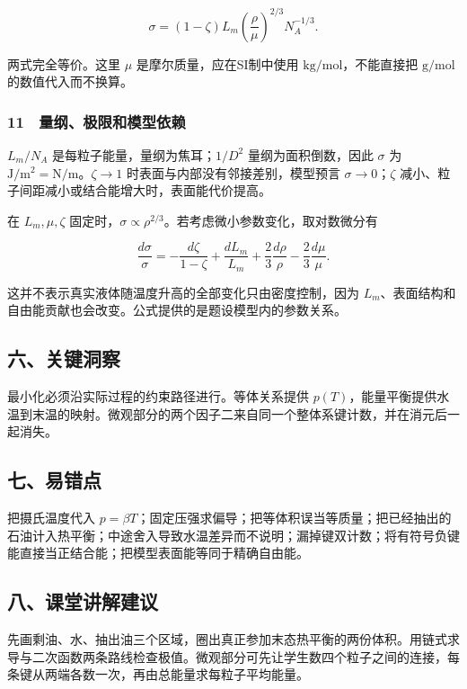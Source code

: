 \documentclass[12pt,a4paper,fontset=fandol]{ctexart}
\begin{document}
\[\boxed{\sigma=(1-\zeta)L_m
\left(\frac\rho\mu\right)^{2/3}N_A^{-1/3}.}\]

两式完全等价。这里 \(\mu\) 是摩尔质量，应在SI制中使用
\(\mathrm{kg/mol}\)，不能直接把 \(\mathrm{g/mol}\) 的数值代入而不换算。

\subsubsection{11　量纲、极限和模型依赖}\label{ux91cfux7eb2ux6781ux9650ux548cux6a21ux578bux4f9dux8d56}

\(L_m/N_A\) 是每粒子能量，量纲为焦耳；\(1/D^2\) 量纲为面积倒数，因此
\(\sigma\) 为 \(\mathrm{J/m^2}= \mathrm{N/m}\)。\(\zeta\to1\)
时表面与内部没有邻接差别，模型预言 \(\sigma\to0\)；\(\zeta\)
减小、粒子间距减小或结合能增大时，表面能代价提高。

在 \(L_m,\mu,\zeta\)
固定时，\(\sigma\propto\rho^{2/3}\)。若考虑微小参数变化，取对数微分有

\[\frac{d\sigma}{\sigma}
=-\frac{d\zeta}{1-\zeta}
+\frac{dL_m}{L_m}
+\frac23\frac{d\rho}{\rho}
-\frac23\frac{d\mu}{\mu}.\]

这并不表示真实液体随温度升高的全部变化只由密度控制，因为
\(L_m\)、表面结构和自由能贡献也会改变。公式提供的是题设模型内的参数关系。

\subsection{六、关键洞察}\label{ux516dux5173ux952eux6d1eux5bdf-2}

最小化必须沿实际过程的约束路径进行。等体关系提供
\(p(T)\)，能量平衡提供水温到末温的映射。微观部分的两个因子二来自同一个整体系键计数，并在消元后一起消失。

\subsection{七、易错点}\label{ux4e03ux6613ux9519ux70b9-2}

把摄氏温度代入
\(p=\beta T\)；固定压强求偏导；把等体积误当等质量；把已经抽出的石油计入热平衡；中途舍入导致水温差异而不说明；漏掉键双计数；将有符号负键能直接当正结合能；把模型表面能等同于精确自由能。

\subsection{八、课堂讲解建议}\label{ux516bux8bfeux5802ux8bb2ux89e3ux5efaux8bae-2}

先画剩油、水、抽出油三个区域，圈出真正参加末态热平衡的两份体积。用链式求导与二次函数两条路线检查极值。微观部分可先让学生数四个粒子之间的连接，每条键从两端各数一次，再由总能量求每粒子平均能量。
\end{document}
